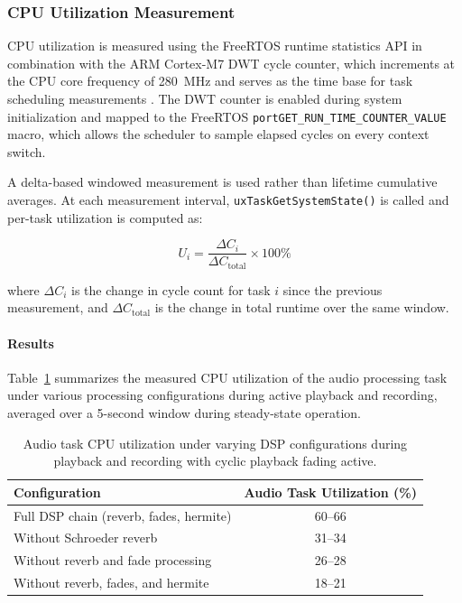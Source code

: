 \subsubsection{CPU Utilization Measurement}

CPU utilization is measured using the FreeRTOS runtime statistics API in combination 
with the ARM Cortex-M7 \ac{DWT} cycle counter, which increments at the CPU core frequency 
of 280~MHz and serves as the time base for task scheduling measurements \cite{RunTimeStatistics}. 
The DWT counter is enabled during system initialization and mapped to the FreeRTOS \texttt{portGET\_RUN\_TIME\_COUNTER\_VALUE} macro, which allows the scheduler to sample elapsed cycles on every context switch.

A delta-based windowed measurement is used rather than lifetime cumulative averages. 
At each measurement interval, \texttt{uxTaskGetSystemState()} is called and per-task utilization is computed as:

\begin{equation}
	U_i = \frac{\Delta C_i}{\Delta C_{\text{total}}} \times 100\%
\end{equation}

where $\Delta C_i$ is the change in cycle count for task $i$ since the previous 
measurement, and $\Delta C_{\text{total}}$ is the change in total runtime over the 
same window.

\paragraph{Results}

Table~\ref{tab:cpu_utilization} summarizes the measured CPU utilization of the audio 
processing task under various processing configurations during active playback and 
recording, averaged over a 5-second window during steady-state operation.

\begin{table}[H]
	\centering
	\begin{tabular}{lc}
		\toprule
		\textbf{Configuration} & \textbf{Audio Task Utilization (\%)} \\
		\midrule
		Full DSP chain (reverb, fades, hermite) & 60--66 \\
		Without Schroeder reverb                & 31--34 \\
		Without reverb and fade processing      & 26--28 \\
		Without reverb, fades, and hermite      & 18--21 \\
		\bottomrule
	\end{tabular}
	\caption{Audio task CPU utilization under varying DSP configurations during 
		playback and recording with cyclic playback fading active.}
	\label{tab:cpu_utilization}
\end{table}

